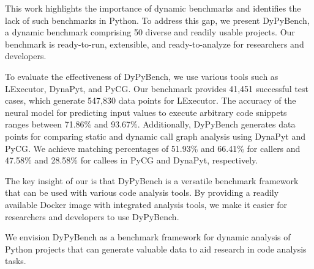 This work highlights the importance of dynamic benchmarks and identifies the lack of such benchmarks in Python.
To address this gap, we present DyPyBench, a dynamic benchmark comprising 50 diverse and readily usable projects.
Our benchmark is ready-to-run, extensible, and ready-to-analyze for researchers and developers.

To evaluate the effectiveness of DyPyBench, we use various tools such as LExecutor, DynaPyt, and PyCG.
Our benchmark provides 41,451 successful test cases, which generate 547,830 data points for LExecutor.
The accuracy of the neural model for predicting input values to execute arbitrary code snippets ranges between 71.86\% and 93.67\%.
Additionally, DyPyBench generates data points for comparing static and dynamic call graph analysis using DynaPyt and PyCG.
We achieve matching percentages of 51.93\% and 66.41\% for callers and 47.58\% and 28.58\% for callees in PyCG and DynaPyt, respectively.

The key insight of our is that DyPyBench is a versatile benchmark framework that can be used with various code analysis tools.
By providing a readily available Docker image with integrated analysis tools, we make it easier for researchers and developers to use DyPyBench.

We envision DyPyBench as a benchmark framework for dynamic analysis of Python projects that can generate valuable data to aid research in code analysis tasks.
